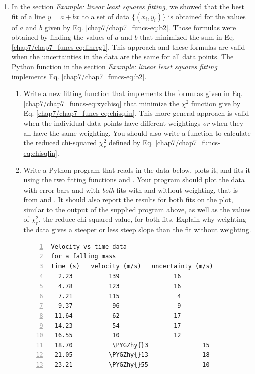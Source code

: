 \documentclass[letterpaper,10pt,english]{sphinxmanual}
\def\PYGZhy{\char`\-}
\begin{document}
\begin{enumerate}
\item {} 
In the section {\hyperref[chap7/chap7_funcs:linfitfunc]{\emph{Example: linear least squares fitting}}}, we showed that the best fit of a line \(y = a + bx\) to a set of data \(\{(x_i,y_i)\}\) is obtained for the values of \(a\) and \(b\) given by Eq. \eqref{chap7/chap7_funcs-eq:b2}.  Those formulas were obtained by finding the values of \(a\) and \(b\) that minimized the sum in Eq. \eqref{chap7/chap7_funcs-eq:linreg1}. This approach and these formulas are valid when the uncertainties in the data are the same for all data points.  The Python function  in the section {\hyperref[chap7/chap7_funcs:linfitfunc]{\emph{Example: linear least squares fitting}}} implements Eq. \eqref{chap7/chap7_funcs-eq:b2}.
\begin{enumerate}
\item {} 
Write a new fitting function  that implements the formulas given in Eq. \eqref{chap7/chap7_funcs-eq:xychisq} that minimize the \(\chi^2\) function give by Eq. \eqref{chap7/chap7_funcs-eq:chisqlin}.  This more general approach is valid when the individual data points have different weightings \emph{or} when they all have the same weighting.  You should also write a function to calculate the reduced chi-squared \(\chi_r^2\) defined by Eq. \eqref{chap7/chap7_funcs-eq:chisqlin}.

\item {} 
Write a Python program that reads in the data below, plots it, and fits it using the two fitting functions   and .  Your program should plot the data with error bars and with \emph{both} fits with and without weighting, that is from  and .  It should also report the results for both fits on the plot, similar to the output of the supplied program above, as well as the values of \(\chi_r^2\), the reduce chi-squared value, for both fits.  Explain why weighting the data gives a steeper or less steep slope than the fit without weighting.

\begin{Verbatim}[commandchars=\\\{\},numbers=left,firstnumber=1,stepnumber=1]
Velocity vs time data
for a falling mass
time (s)   velocity (m/s)   uncertainty (m/s)
  2.23          139               16
  4.78          123               16
  7.21          115                4
  9.37           96                9
 11.64           62               17
 14.23           54               17
 16.55           10               12
 18.70           \PYGZhy{}3               15
 21.05          \PYGZhy{}13               18
 23.21          \PYGZhy{}55               10
\end{Verbatim}


\end{enumerate}
\end{enumerate}
\end{document}
